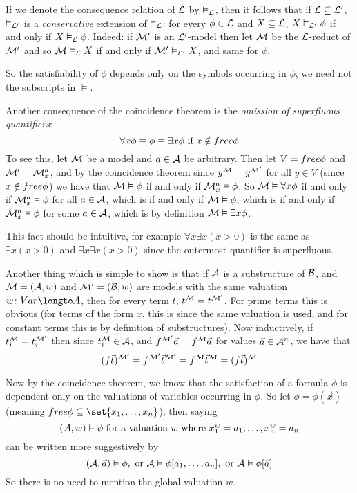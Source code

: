 If we denote the consequence relation of ${\cal L}$ by $\vDash_{\cal L}$, then it follows that if ${\cal L}\subseteq{\cal L}'$, $\vDash_{\cal L'}$ is a {\it conservative} extension of $\vDash_{\cal L}$:
for every $\phi\in{\cal L}$ and $X\subseteq{\cal L}$, $X\vDash_{\cal L'}\phi$ if and only if $X\vDash_{\cal L}\phi$.
Indeed: if ${\cal M}'$ is an ${\cal L'}$-model then let ${\cal M}$ be the ${\cal L}$-reduct of ${\cal M}'$ and so ${\cal M}\vDash_{\cal L} X$ if and only if ${\cal M}'\vDash_{\cal L'}X$, and same for $\phi$.

So the satisfiability of $\phi$ depends only on the symbols occurring in $\phi$, we need not the subscripts in $\vDash$.

Another consequence of the coincidence theorem is the {\it omission of superfluous quantifiers}:
$$ \forall x\phi \equiv \phi \equiv \exists x\phi \hbox{ if $x\notin{\sl free}\phi$} $$
To see this, let ${\cal M}$ be a model and $a\in{\cal A}$ be arbitrary.
Then let $V={\sl free}\phi$ and ${\cal M}'={\cal M}^a_x$, and by the coincidence theorem since $y^{\cal M}=y^{\cal M'}$ for all $y\in V$ (since $x\notin{\sl free}\phi$) we have that ${\cal M}\vDash\phi$ if and
only if ${\cal M}^a_x\vDash\phi$.
So ${\cal M}\vDash\forall x\phi$ if and only if ${\cal M}^a_x\vDash\phi$ for all $a\in{\cal A}$, which is if and only if ${\cal M}\vDash\phi$, which is if and only if ${\cal M}^a_x\vDash\phi$ for some
$a\in{\cal A}$, which is by definition ${\cal M}\vDash\exists x\phi$.

This fact should be intuitive, for example $\forall x\exists x(x>0)$ is the same as $\exists x(x>0)$ and $\exists x\exists x(x>0)$ since the outermost quantifier is superfluous.

Another thing which is simple to show is that if ${\cal A}$ is a substructure of ${\cal B}$, and ${\cal M}=({\cal A},w)$ and ${\cal M}'=({\cal B},w)$ are models with the same valuation
$w\colon\Var\longto A$, then for every term $t$, $t^{\cal M}=t^{\cal M'}$.
For prime terms this is obvious (for terms of the form $x$, this is since the same valuation is used, and for constant terms this is by definition of substructures).
Now inductively, if $t_i^{\cal M}=t_i^{\cal M'}$ then since $t_i^{\cal M}\in{\cal A}$, and $f^{\cal M'}\vec a=f^{\cal M}\vec a$ for values $\vec a\in{\cal A}^n$, we have that
$$ (f\vec t)^{\cal M'} = f^{\cal M'}\vec t^{\cal M'} = f^{\cal M}\vec t^{\cal M} = (f\vec t)^{\cal M} $$

Now by the coincidence theorem, we know that the satisfaction of a formula $\phi$ is dependent only on the valuations of variables occurring in $\phi$.
So let $\phi=\phi(\vec x)$ (meaning $\free\phi\subseteq\set{x_1,\dots,x_n}$), then saying
$$ ({\cal A},w)\vDash\phi\hbox{ for a valuation $w$ where $x_1^w=a_1,\dots,x_n^w=a_n$} $$
can be written more suggestively by
$$ ({\cal A},\vec a)\vDash\phi,\hbox{ or } {\cal A}\vDash\phi[a_1,\dots,a_n],\hbox{ or }{\cal A}\vDash\phi[\vec a] $$
So there is no need to mention the global valuation $w$.

